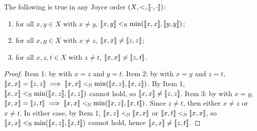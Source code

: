 \begin{lemma}\label{lem:prop-of-JO}
  The following is true in any Joyce order $(X,<,\llbracket \cdot , \cdot \rrbracket)$:
  \begin{enumerate}
  \item\label{it:prop-of-JO-0} for all $x,y \in X$ with $x\neq y$, $\llbracket x , y \rrbracket <_{\mathbb{N}} \min(\llbracket x , x \rrbracket, \llbracket y , y \rrbracket)$;
  \item\label{it:prop-of-JO-1} for all $x,y \in X$ with $x\neq z$, $\llbracket x , x \rrbracket\neq \llbracket z , z \rrbracket$;
  \item\label{it:prop-of-JO-2} for all $x,z,t \in X$ with $z\neq t$, $\llbracket x , x \rrbracket\neq \llbracket z , t \rrbracket$.
  \end{enumerate}
\end{lemma}
\begin{proof}
  Item 1: by  with $x=z$ and $y=t$.
  Item 2: by  with $x=y$ and $z=t$, $\llbracket x , x \rrbracket=\llbracket z , z \rrbracket\implies \llbracket x , x \rrbracket<_{\mathbb{N}}\min(\llbracket x , z \rrbracket, \llbracket x , z \rrbracket)$. By Item 1, $\llbracket x , x \rrbracket<_{\mathbb{N}}\min(\llbracket x , z \rrbracket, \llbracket x , z \rrbracket)$ cannot hold, so $\llbracket x , x \rrbracket\neq\llbracket z , z \rrbracket$.
  Item 3: by  with $x=y$, $\llbracket x , x \rrbracket=\llbracket z , t \rrbracket\implies \llbracket x , x \rrbracket<_{\mathbb{N}}\min(\llbracket x , z \rrbracket, \llbracket x , t \rrbracket)$. Since $z \neq t$, then either $x \neq z$ or $x \neq t$. In either case, by Item 1, $\llbracket x , z \rrbracket <_{\mathbb{N}} \llbracket x , x \rrbracket$ or $\llbracket x , t \rrbracket <_{\mathbb{N}} \llbracket x , x \rrbracket$, so $\llbracket x , x \rrbracket<_{\mathbb{N}}\min(\llbracket x , z \rrbracket, \llbracket x , t \rrbracket)$ cannot hold, hence $\llbracket x , x \rrbracket\neq\llbracket z , t \rrbracket$.

\end{proof}

